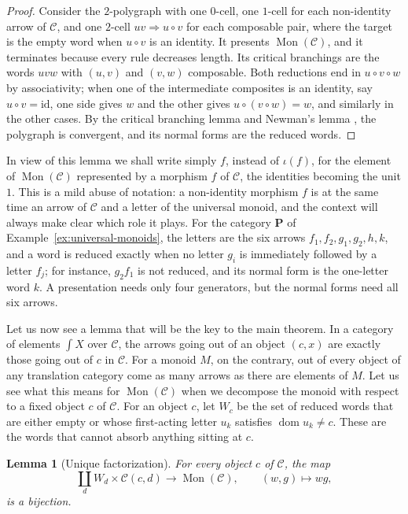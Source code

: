 \documentclass[11pt]{amsart}
\newtheorem{lemma}[teo]{Lemma}
\theoremstyle{definition}
\theoremstyle{remark}
\numberwithin{figure}{section}%
\newcommand{\CC}{\mathcal{C}}
\DeclareMathOperator{\Mon}{Mon}
\DeclareMathOperator{\dom}{dom}
\newcommand{\C}{\mathcal{C}}
\begin{document}
\begin{proof}
Consider the $2$-polygraph with one $0$-cell, one $1$-cell for each non-identity arrow of $\C$, and one $2$-cell $uv\Rightarrow u\circ v$ for each composable pair, where the target is the empty word when $u\circ v$ is an identity. It presents $\Mon(\C)$, and it terminates because every rule decreases length. Its critical branchings are the words $uvw$ with $(u,v)$ and $(v,w)$ composable. Both reductions end in $u\circ v\circ w$ by associativity; when one of the intermediate composites is an identity, say $u\circ v=\mathrm{id}$, one side gives $w$ and the other gives $u\circ(v\circ w)=w$, and similarly in the other cases. By the critical branching lemma \cite[Lemma~4.3.7]{Poly} and Newman's lemma \cite[Lemma~1.3.21]{Poly}, the polygraph is convergent, and its normal forms are the reduced words.
\end{proof}

In view of this lemma we shall write simply $f$, instead of $\iota(f)$, for the element of $\Mon(\CC)$ represented by a morphism $f$ of $\CC$, the identities becoming the unit $1$. This is a mild abuse of notation: a non-identity morphism $f$ is at the same time an arrow of $\CC$ and a letter of the universal monoid, and the context will always make clear which role it plays. For the category $\mathbf P$ of Example~\ref{ex:universal-monoids}, the letters are the six arrows $f_1,f_2,g_1,g_2,h,k$, and a word is reduced exactly when no letter $g_i$ is immediately followed by a letter $f_j$; for instance, $g_2f_1$ is not reduced, and its normal form is the one-letter word $k$. A presentation needs only four generators, but the normal forms need all six arrows.

Let us now see a lemma that will be the key to the main theorem. In a category of elements $\int X$ over $\CC$, the arrows going out of an object $(c,x)$ are exactly those going out of $c$ in $\CC$. For a monoid $M$, on the contrary, out of every object of any translation category come as many arrows as there are elements of $M$. Let us see what this means for $\Mon(\CC)$ when we decompose the monoid with respect to a fixed object $c$ of $\CC$. For an object $c$, let $W_c$ be the set of reduced words that are either empty or whose first-acting letter $u_k$ satisfies $\dom u_k\neq c$. These are the words that cannot absorb anything sitting at $c$.

\begin{lemma}[Unique factorization]\label{lem:fact}
For every object $c$ of $\C$, the map
\[
\coprod_dW_d\times\C(c,d)\longrightarrow\Mon(\C),\qquad (w,g)\longmapsto wg,
\]
is a bijection.
\end{lemma}
\end{document}
